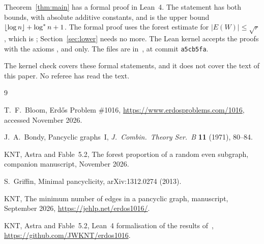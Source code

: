 \documentclass[11pt]{article}
\begin{document}
Theorem~\ref{thm:main} has a formal proof in Lean~4. The statement 
has both bounds, with absolute additive constants, and
 is the upper bound
$\lfloor\log n\rfloor+\log^{*} n+1$. The formal proof uses the forest estimate for
$|E(W)|\le\sqrt r$, which is ;
Section~\ref{sec:lower} needs no more. The Lean kernel accepts the proofs with the axioms
,  and  only. The files are
in~\cite{Repo}, at commit \texttt{a5cb5fa}.

The kernel check covers these formal statements, and it does not cover the text of this paper.
No referee has read the text.

\begin{thebibliography}{9}\small

 T.~F.~Bloom, Erd\H{o}s Problem \#1016, \url{https://www.erdosproblems.com/1016},
accessed November 2026.

 J.~A.~Bondy, Pancyclic graphs~I, \emph{J.~Combin.\ Theory Ser.~B} \textbf{11}
(1971), 80--84.

 KNT, Astra and Fable~5.2, The forest proportion of a random even subgraph,
companion manuscript, November 2026.

 S.~Griffin, Minimal pancyclicity, arXiv:1312.0274 (2013).

 KNT, The minimum number of edges in a pancyclic graph, manuscript, September 2026,
\url{https://jehlp.net/erdos1016/}.

 KNT, Astra and Fable~5.2, Lean~4 formalisation of the results of~\cite{KNT},
\url{https://github.com/JWKNT/erdos1016}.

\end{thebibliography}
\end{document}
